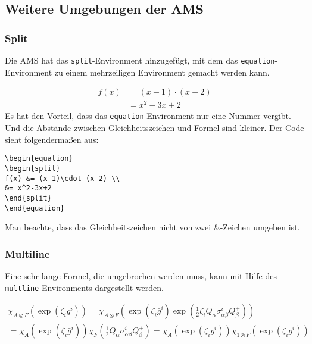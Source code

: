\subsection{Weitere Umgebungen der AMS}

\subsubsection{Split}

Die AMS hat das \texttt{split}-Environment hinzugefügt, mit dem das \texttt{equation}-Environment zu einem mehrzeiligen Environment gemacht werden kann.

\begin{equation}
\begin{split}
f(x) &= (x-1)\cdot (x-2) \\
&= x^2-3x+2
\end{split}
\end{equation}
Es hat den Vorteil, dass das \texttt{equation}-Environment nur eine Nummer vergibt. Und die Abstände zwischen Gleichheitszeichen und Formel sind kleiner. Der Code sieht folgendermaßen aus:
\begin{verbatim}
\begin{equation}
\begin{split}
f(x) &= (x-1)\cdot (x-2) \\
&= x^2-3x+2
\end{split}
\end{equation}
\end{verbatim}
Man beachte, dass das Gleichheitszeichen nicht von zwei \&-Zeichen umgeben ist.

\subsubsection{Multiline}

Eine sehr lange Formel, die umgebrochen werden muss, kann mit Hilfe des \texttt{multline}-Environments dargestellt werden.

\begin{multline}\label{eq:chi}
\chi_{\bar{A}\otimes F}(\exp(\zeta_i g^i))  = \chi_{\bar{A}\otimes F}\left( \exp(\zeta_i \bar{g}^i) \exp(\frac{1}{2} \zeta_i Q_\alpha \sigma^i_{\alpha \beta} Q^+_\beta)\right) \\
= \chi_{\bar{A}}\left( \exp(\zeta_i \bar{g}^i) \right) \chi_F \left( \frac{1}{2} Q_\alpha \sigma^i_{\alpha \beta} Q^+_\beta \right)
= \chi_A \left( \exp (\zeta_i g^i) \right) \chi_{1\otimes F} \left( \exp(\zeta_i g^i) \right)
\end{multline}

